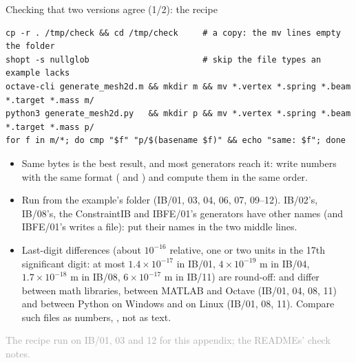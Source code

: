 \documentclass[aspectratio=169,11pt]{beamer}
\newcommand{\sourcecredit}[1]{\vfill\begin{flushright}\tiny\textcolor{DarkGray}{#1}\end{flushright}}
\begin{document}
\begin{frame}[fragile]{Checking that two versions agree (1/2): the recipe}
\label{fr:check}
\begin{lstlisting}[style=shell]
cp -r . /tmp/check && cd /tmp/check     # a copy: the mv lines empty the folder
shopt -s nullglob                       # skip the file types an example lacks
octave-cli generate_mesh2d.m && mkdir m && mv *.vertex *.spring *.beam *.target *.mass m/
python3 generate_mesh2d.py   && mkdir p && mv *.vertex *.spring *.beam *.target *.mass p/
for f in m/*; do cmp "$f" "p/$(basename $f)" && echo "same: $f"; done
\end{lstlisting}
\footnotesize
\begin{itemize}\setlength{\itemsep}{1pt}
  \item Same bytes is the best result, and most generators reach it: write numbers with the same format ( and ) and compute them in the same order.
  \item Run from the example's folder (IB/01, 03, 04, 06, 07, 09--12). IB/02's, IB/08's, the ConstraintIB and IBFE/01's generators have other names (and IBFE/01's writes a  file): put their names in the two middle lines.
  \item Last-digit differences (about $10^{-16}$ relative, one or two units in the 17th significant digit: at most $1.4\times10^{-17}$ in IB/01, $4\times10^{-19}$ m in IB/04, $1.7\times10^{-18}$ m in IB/08, $6\times10^{-17}$ m in IB/11) are round-off:  and  differ between math libraries, between MATLAB and Octave (IB/01, 04, 08, 11) and between Python on Windows and on Linux (IB/01, 08, 11). Compare such files as numbers, , not as text.
\end{itemize}
\sourcecredit{The recipe run on IB/01, 03 and 12 for this appendix; the READMEs' check notes.}
\end{frame}
\end{document}

